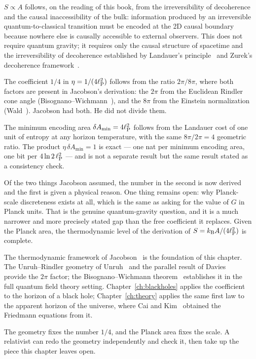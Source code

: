 $S\propto A$ follows, on the reading of this book, from the irreversibility of decoherence and the causal inaccessibility of the bulk: information produced
by an irreversible quantum-to-classical transition must be encoded at the 2D causal boundary because nowhere else is causally accessible to external
observers. This does not require quantum gravity; it requires only the causal structure of spacetime and the irreversibility of decoherence established
by Landauer's principle~\cite{Landauer1961} and Zurek's decoherence framework~\cite{Zurek2003}. \interp

The coefficient $1/4$ in $\eta=1/(4\ell_{\mathrm P}^2)$ follows from the ratio $2\pi/8\pi$, where both factors are present in Jacobson's derivation: the $2\pi$ from the
Euclidean Rindler cone angle (Bisognano--Wichmann~\cite{BisognanoWichmann1976}), and the $8\pi$ from the Einstein normalization (Wald~\cite{Wald1984}). Jacobson had both. He did
not divide them. \derived

The minimum encoding area $\delta A_{\min}=4\ell_{\mathrm P}^2$ follows from the Landauer cost of one unit of entropy at any horizon temperature, with the same $8\pi/2\pi=4$
geometric ratio. The product $\eta\,\delta A_{\min}=1$ is exact --- one nat per minimum encoding area, one bit per $4\ln2\,\ell_{\mathrm P}^2$ --- and is not a separate
result but the same result stated as a consistency check. \derived

Of the two things Jacobson assumed, the number in the second is now derived and the first is given a physical reason. One thing remains open: why
Planck-scale discreteness exists at all, which is the same as asking for the value of $G$ in Planck units. That is the genuine quantum-gravity question, and
it is a much narrower and more precisely stated gap than the free coefficient it replaces. Given the Planck area, the thermodynamic level of the derivation
of $S=k_{\mathrm B} A/(4\ell_{\mathrm P}^2)$ is complete.

The thermodynamic framework of Jacobson~\cite{Jacobson1995} is the foundation of this chapter. The Unruh--Rindler geometry of Unruh~\cite{Unruh1976} and the parallel result of
Davies~\cite{Davies1975} provide the $2\pi$ factor; the Bisognano--Wichmann theorem~\cite{BisognanoWichmann1976} establishes it in the full quantum field theory setting.
Chapter~\ref{ch:blackholes} applies the coefficient to the horizon of a black hole; Chapter~\ref{ch:theory} applies the same first law to the apparent horizon of the
universe, where Cai and Kim~\cite{CaiKim2005} obtained the Friedmann equations from it.

The geometry fixes the number $1/4$, and the Planck area fixes the scale. A relativist can redo the geometry independently and check it, then take up the piece this chapter leaves open.
